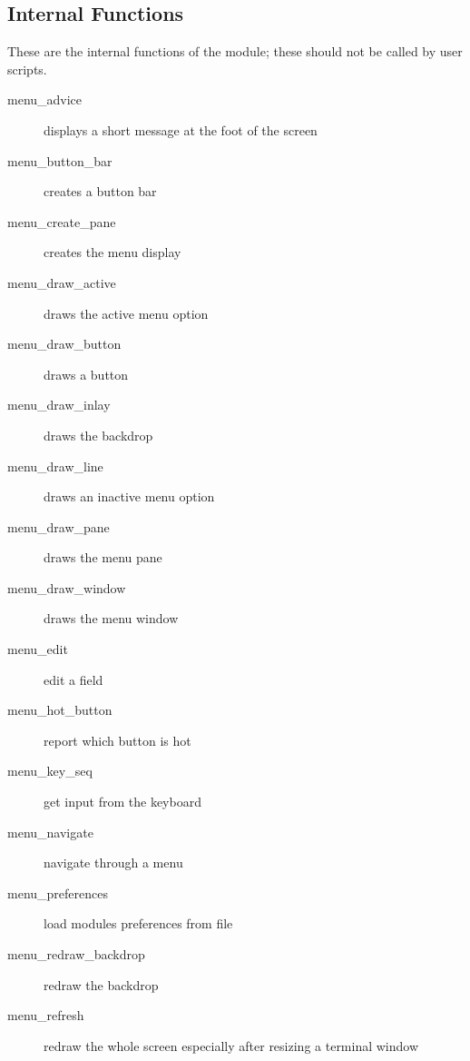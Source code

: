 \documentclass[a4paper]{scrartcl}
\begin{document}
\subsection{Internal Functions}
These are the internal functions of the module; these should not be called by user scripts.
\begin{description}
\item [menu\_advice] displays a short message at the foot of the screen
\item [menu\_button\_bar] creates a button bar
\item [menu\_create\_pane] creates the menu display
\item [menu\_draw\_active] draws the active menu option
\item [menu\_draw\_button] draws a button
\item [menu\_draw\_inlay] draws the backdrop
\item [menu\_draw\_line] draws an inactive menu option
\item [menu\_draw\_pane] draws the menu pane
\item [menu\_draw\_window] draws the menu window
\item [menu\_edit] edit a field
\item [menu\_hot\_button] report which button is hot
\item [menu\_key\_seq] get input from the keyboard
\item [menu\_navigate] navigate through a menu
\item [menu\_preferences] load modules preferences from file
\item [menu\_redraw\_backdrop] redraw the backdrop
\item [menu\_refresh] redraw the whole screen especially after resizing a terminal window
\end{description}
\end{document}
